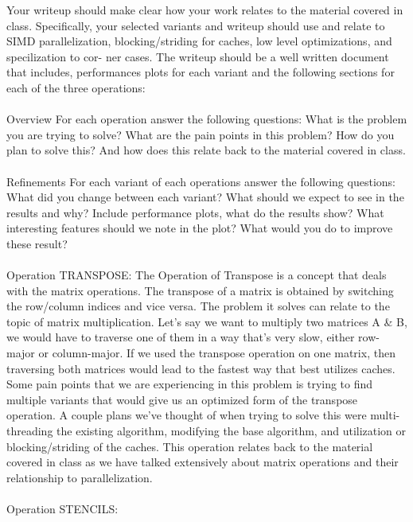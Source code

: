 \documentclass{article}
\begin{document}
Your writeup should make clear how your work relates to the material covered in class. Specifically, your selected variants and writeup should use and relate to SIMD
parallelization, blocking/striding for caches, low level optimizations, and specilization to cor-
ner cases. The writeup should be a well written document that includes, performances plots
for each variant and the following sections for each of the three operations:
\\ \\

Overview For each operation answer the following questions: What is the problem you are
trying to solve? What are the pain points in this problem? How do you plan to solve
this? And how does this relate back to the material covered in class.
\\ \\

Refinements For each variant of each operations answer the following questions: What did
you change between each variant? What should we expect to see in the results and why?
Include performance plots, what do the results show? What interesting features should
we note in the plot? What would you do to improve these result?
\\ \\

Operation TRANSPOSE: The Operation of Transpose is a concept that deals with the matrix operations. The transpose of a matrix is obtained by switching the row/column indices and vice versa.  The problem it solves can relate to the topic of matrix multiplication. Let’s say we want to multiply two matrices A \& B, we would have to traverse one of them in a way that's very slow, either row-major or column-major. If we used the transpose operation on one matrix, then traversing both matrices would lead to the fastest way that best utilizes caches. Some pain points that we are experiencing in this problem is trying to find multiple variants that would give us an optimized form of the transpose operation. A couple plans we’ve thought of when trying to solve this were multi-threading the existing algorithm, modifying the base algorithm, and utilization or blocking/striding of the caches. This operation relates back to the material covered in class as we have talked extensively about matrix operations and their relationship to parallelization.
\\ \\

Operation STENCILS:
\end{document}
